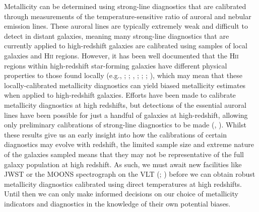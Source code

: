 \documentclass[usenatbib]{mnras} %
\begin{document}
Metallicity can be determined using strong-line diagnostics that are calibrated through measurements of the temperature-sensitive ratio of auroral and nebular emission lines. These auroral lines are typically extremely weak and difficult to detect in distant galaxies, meaning many strong-line diagnostics that are currently applied to high-redshift galaxies are calibrated using samples of local galaxies and \textsc{Hii} regions. However, it has been well documented that the \textsc{Hii} regions within high-redshift star-forming galaxies have different physical properties to those found locally (e.g., \citealt{Kewley_2013}; \citealt{Steidel_2014}; \citealt{Shapley_2015}, \citeyear{Shapley_2019}; \citealt{Sanders_2016}; \citealt{Kashino_2017}; \citealt{Strom_2017}), which may mean that these locally-calibrated metallicity diagnostics can yield biased metallicity estimates when applied to high-redshift galaxies. Efforts have been made to calibrate metallicity diagnostics at high redshifts, but detections of the essential auroral lines have been possible for just a handful of galaxies at high-redshift, allowing only preliminary calibrations of strong-line diagnostics to be made (\citealt{Sanders_2016auro}, \citeyear{Sanders_2020OH}). Whilst these results give us an early insight into how the calibrations of certain diagnostics may evolve with redshift, the limited sample size and extreme nature of the galaxies sampled means that they may not be representative of the full galaxy population at high redshift. As such, we must await new facilities like JWST or the MOONS spectrograph on the VLT (\citealt{Cirasuolo_2020}; \citealt{Maiolino_2020}) before we can obtain robust metallicity diagnostics calibrated using direct temperatures at high redshifts. Until then we can only make informed decisions on our choice of metallicity indicators and diagnostics in the knowledge of their own potential biases.
\end{document}
